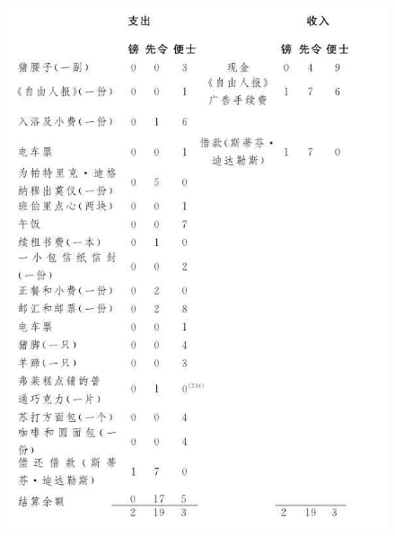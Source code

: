 \begin{figure}[htb]
    \centering
    \includegraphics[scale=0.6]{picture/尤利西斯4.jpeg}
\end{figure}

